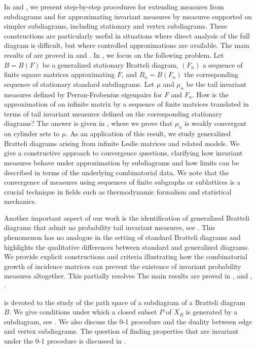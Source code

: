 \documentclass[11pt,reqno]{amsart}
\theoremstyle{definition}
\theoremstyle{remark}
\theoremstyle{plain}
\numberwithin{equation}{section}
\begin{document}
In  and , we present step-by-step procedures for extending measures from subdiagrams and for approximating invariant measures by measures supported on simpler subdiagrams, including stationary and vertex subdiagrams. These constructions are particularly useful in situations where direct analysis of the full diagram is difficult, but where controlled approximations are available. The main results of  are proved in  and . In , we focus on the following problem. Let $B = B(F)$ be a generalized stationary Bratteli diagram, $(F_n)$ a sequence of finite square matrices approximating $F$, and $B_n = B(F_n)$ the corresponding sequence of stationary standard subdiagrams. Let $\mu$ and $\mu_n$ be the tail invariant measures defined by Perron-Frobenius eigenpairs for $F$ and $F_n$. How is the approximation of an infinite matrix by a sequence of finite matrices translated in terms of tail invariant measures defined on the corresponding stationary diagrams? The answer is given in , where we prove that $\mu_n$ is weakly convergent on cylinder sets to $\mu$. 
As an application of this result, we study generalized Bratteli diagrams arising from infinite Leslie matrices and related models. We give a constructive approach to convergence questions, clarifying how invariant measures behave under approximation by subdiagrams and how limits can be described in terms of the underlying combinatorial data. We note that the convergence of measures using sequences of finite subgraphs or sublattices is a crucial technique in fields such as thermodynamic formalism and statistical mechanics.

Another important aspect of our work is the identification of generalized Bratteli diagrams that admit no probability tail invariant measures, see . This phenomenon has no analogue in the setting of standard Bratteli diagrams and highlights the qualitative differences between standard and generalized diagrams. We provide explicit constructions and criteria illustrating how the combinatorial growth of incidence matrices can prevent the existence of invariant probability measures altogether. This partially resolves \cite[Problem 4, Section 9]{BezuglyiJorgensenKarpelSanadhya2025} The main results are proved in ,  and , . 

 is devoted to the study of the path space of a subdiagram of a Bratteli diagram $B$. We give conditions under which a closed subset $P$ of $X_B$ is generated by a subdiagram, see . We also discuss the 0-1 procedure and the duality between edge and vertex subdiagrams. The question of finding properties that are invariant under the 0-1 procedure is discussed in . 
\end{document}
